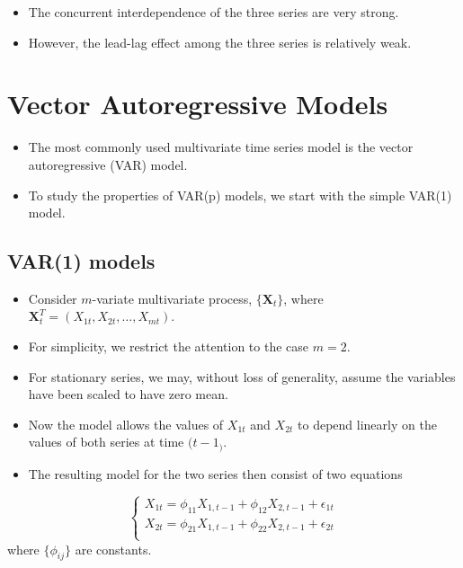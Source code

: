 \documentclass[]{book}
\providecommand{\tightlist}{%
  \setlength{\itemsep}{0pt}\setlength{\parskip}{0pt}}
\begin{document}
\begin{itemize}
\tightlist
\item
  The concurrent interdependence of the three series are very strong.
\item
  However, the lead-lag effect among the three series is relatively weak.
\end{itemize}

\hypertarget{vector-autoregressive-models}{%
\section{Vector Autoregressive Models}\label{vector-autoregressive-models}}

\begin{itemize}
\tightlist
\item
  The most commonly used multivariate time series model is the vector autoregressive (VAR) model.
\item
  To study the properties of VAR(p) models, we start with the simple VAR(1) model.
\end{itemize}

\hypertarget{var1-models}{%
\subsection{VAR(1) models}\label{var1-models}}

\begin{itemize}
\tightlist
\item
  Consider \(m\)-variate multivariate process, \(\{\mathbf{X}_t\}\), where \(\mathbf{X}_t^T=(X_{1t}, X_{2t}, \dots, X_{mt}).\)
\item
  For simplicity, we restrict the attention to the case \(m=2.\)
\item
  For stationary series, we may, without loss of generality, assume the variables have been scaled to have zero mean.
\item
  Now the model allows the values of \(X_{1t}\) and \(X_{2t}\) to depend linearly on the values of both series at time \((t-1_).\)
\item
  The resulting model for the two series then consist of two equations
\end{itemize}

\[
\begin{cases}
    X_{1t} = \phi_{11}X_{1,t-1}+ \phi_{12}X_{2,t-1}+\epsilon_{1t}\\
   X_{2t} = \phi_{21}X_{1,t-1}+ \phi_{22}X_{2,t-1}+\epsilon_{2t}\\
\end{cases}
\]
where \(\{\phi_{ij}\}\) are constants.
\end{document}

